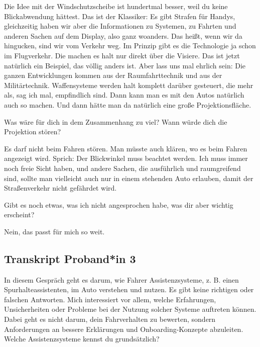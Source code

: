 Die Idee mit der Windschutzscheibe ist hundertmal besser, weil du keine
Blickabwendung hättest. Das ist der Klassiker: Es gibt Strafen für
Handys, gleichzeitig haben wir aber die Informationen zu Systemen, zu
Fahrten und anderen Sachen auf dem Display, also ganz woanders. Das
heißt, wenn wir da hingucken, sind wir vom Verkehr weg. Im Prinzip gibt
es die Technologie ja schon im Flugverkehr. Die machen es halt nur
direkt über die Visiere. Das ist jetzt natürlich ein Beispiel, das
völlig anders ist. Aber lass uns mal ehrlich sein: Die ganzen
Entwicklungen kommen aus der Raumfahrttechnik und aus der
Militärtechnik. Waffensysteme werden halt komplett darüber gesteuert,
die mehr als, sag ich mal, empfindlich sind. Dann kann man es mit den
Autos natürlich auch so machen. Und dann hätte man da natürlich eine
große Projektionsfläche.

\interviewerin
Was wäre für dich in dem Zusammenhang zu viel? Wann würde dich die
Projektion stören?

Es darf nicht beim Fahren stören. Man müsste auch klären, wo es beim
Fahren angezeigt wird. Sprich: Der Blickwinkel muss beachtet werden.
Ich muss immer noch freie Sicht haben, und andere Sachen, die
ausführlich und raumgreifend sind, sollte man vielleicht auch nur in
einem stehenden Auto erlauben, damit der Straßenverkehr nicht gefährdet
wird.

\interviewerin
Gibt es noch etwas, was ich nicht angesprochen habe, was dir aber
wichtig erscheint?

Nein, das passt für mich so weit.



\clearpage
\subsection{Transkript Proband*in 3}
\label{subsec:transkript-p3}

\interviewerin
In diesem Gespräch geht es darum, wie Fahrer Assistenzsysteme, z. B.
einen Spurhalteassistenten, im Auto verstehen und nutzen. Es gibt keine
richtigen oder falschen Antworten. Mich interessiert vor allem, welche
Erfahrungen, Unsicherheiten oder Probleme bei der Nutzung solcher
Systeme auftreten können. Dabei geht es nicht darum, dein Fahrverhalten
zu bewerten, sondern Anforderungen an bessere Erklärungen und
Onboarding-Konzepte abzuleiten. Welche Assistenzsysteme kennst du
grundsätzlich?

